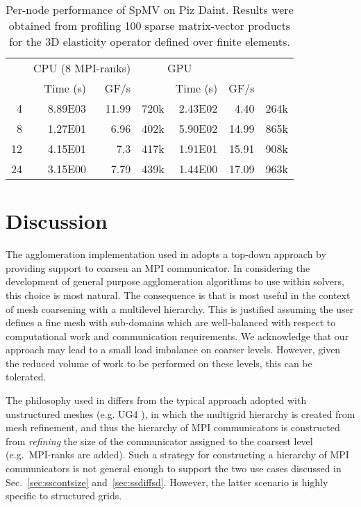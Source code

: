 \documentclass[]{siamart0216}
\begin{document}
\begin{table}[h!]
\centering
\caption{Per-node performance of SpMV on Piz Daint.
Results were obtained from profiling 100 sparse matrix-vector products for the 
3D elasticity operator defined over    finite elements. 
}
\begin{tabular}{r r r r r r r}
\toprule
	   &\multicolumn{2}{c}{CPU (8 MPI-ranks)}	&\multicolumn{2}{c}{GPU} \\
    &Time (s)     &GF/s   &  &Time (s)     &GF/s &\\
\toprule
4	&8.89E03	&11.99	&720k &2.43E02	&4.40 &264k\\
8	&1.27E01	&6.96	&402k &5.90E02	&14.99 &865k\\
12	&4.15E01	&7.3		&417k &1.91E01	&15.91 &908k\\ 24	&3.15E00	&7.79	&439k &1.44E00	&17.09 &963k\\
\bottomrule
\end{tabular}
\label{tab:spmv}
\end{table}

\section{Discussion}
The agglomeration implementation used in  adopts a top-down approach by 
providing support to coarsen an MPI communicator. 
In considering the development of general purpose agglomeration algorithms to use within solvers, 
this choice is most natural. The consequence is that  is most useful in the context 
of mesh coarsening with a multilevel hierarchy. This is justified assuming the user defines a fine mesh 
with sub-domains which are well-balanced with respect to computational work and communication requirements. 
We acknowledge that our approach may lead to a small load imbalance on coarser levels. 
However, given the reduced volume of 
work to be performed on these levels, this can be tolerated. 

The philosophy used in  differs from the typical approach adopted with unstructured meshes (e.g. UG4 \cite{reiter2013massively}), in which 
the multigrid hierarchy is created from mesh refinement, and thus the hierarchy of MPI 
communicators is constructed from \textit{refining} the size of the communicator assigned to the 
coarsest level (e.g.~MPI-ranks are added).
Such a strategy for constructing a hierarchy of MPI communicators is not general enough
to support the two use cases discussed in Sec.~\ref{sec:sscontsize} and~\ref{sec:ssdiffsd}. 
However, the latter scenario is highly specific to structured grids.
\end{document}

